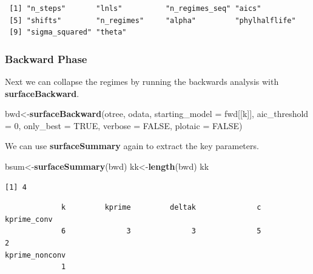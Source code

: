 \documentclass[
]{book}
\newenvironment{Shaded}{\begin{snugshade}}{\end{snugshade}}
\newcommand{\DataTypeTok}[1]{\textcolor[rgb]{0.13,0.29,0.53}{#1}}
\newcommand{\DecValTok}[1]{\textcolor[rgb]{0.00,0.00,0.81}{#1}}
\newcommand{\KeywordTok}[1]{\textcolor[rgb]{0.13,0.29,0.53}{\textbf{#1}}}
\newcommand{\NormalTok}[1]{#1}
\newcommand{\OperatorTok}[1]{\textcolor[rgb]{0.81,0.36,0.00}{\textbf{#1}}}
\newcommand{\OtherTok}[1]{\textcolor[rgb]{0.56,0.35,0.01}{#1}}
\begin{document}
\begin{verbatim}
 [1] "n_steps"       "lnls"          "n_regimes_seq" "aics"         
 [5] "shifts"        "n_regimes"     "alpha"         "phylhalflife" 
 [9] "sigma_squared" "theta"        
\end{verbatim}

\hypertarget{backward-phase}{%
\subsubsection{Backward Phase}\label{backward-phase}}

Next we can collapse the regimes by running the backwards analysis with \textbf{surfaceBackward}.

\begin{Shaded}
\begin{Highlighting}[]
\NormalTok{bwd\textless{}{-}}\KeywordTok{surfaceBackward}\NormalTok{(otree, odata, }\DataTypeTok{starting\_model =}\NormalTok{ fwd[[k]], }
                     \DataTypeTok{aic\_threshold =} \DecValTok{0}\NormalTok{, }\DataTypeTok{only\_best =} \OtherTok{TRUE}\NormalTok{, }
                     \DataTypeTok{verbose =} \OtherTok{FALSE}\NormalTok{, }\DataTypeTok{plotaic =} \OtherTok{FALSE}\NormalTok{)}
\end{Highlighting}
\end{Shaded}

We can use \textbf{surfaceSummary} again to extract the key parameters.

\begin{Shaded}
\begin{Highlighting}[]
\NormalTok{bsum\textless{}{-}}\KeywordTok{surfaceSummary}\NormalTok{(bwd)}
\NormalTok{kk\textless{}{-}}\KeywordTok{length}\NormalTok{(bwd)}
\NormalTok{kk}
\end{Highlighting}
\end{Shaded}

\begin{verbatim}
[1] 4
\end{verbatim}

\begin{Shaded}
\end{Shaded}

\begin{verbatim}
             k         kprime         deltak              c    kprime_conv 
             6              3              3              5              2 
kprime_nonconv 
             1 
\end{verbatim}
\end{document}
